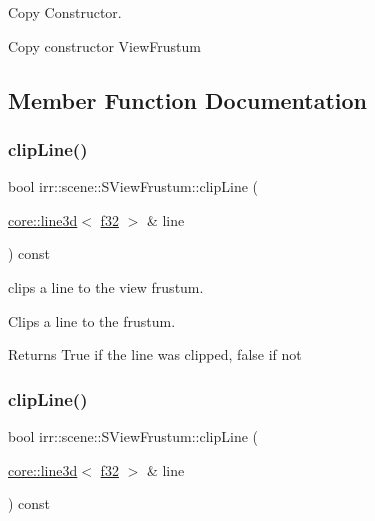 Copy Constructor. 

Copy constructor View\+Frustum 

\subsection{Member Function Documentation}
\mbox{\label{structirr_1_1scene_1_1SViewFrustum_a8d4a42afc55dde3b193ad0b1311f9dfe}} 
\subsubsection{\texorpdfstring{clip\+Line()}{clipLine()}\hspace{0.1cm}{\footnotesize\ttfamily [1/2]}}
{\footnotesize\ttfamily bool irr\+::scene\+::\+S\+View\+Frustum\+::clip\+Line (\begin{DoxyParamCaption}\item[{\hyperlink{classirr_1_1core_1_1line3d}{core\+::line3d}$<$ \hyperlink{namespaceirr_a0277be98d67dc26ff93b1a6a1d086b07}{f32} $>$ \&}]{line }\end{DoxyParamCaption}) const\hspace{0.3cm}{\ttfamily [inline]}}



clips a line to the view frustum. 

Clips a line to the frustum.

\begin{DoxyReturn}{Returns}
True if the line was clipped, false if not 
\end{DoxyReturn}
\mbox{\label{structirr_1_1scene_1_1SViewFrustum_a8d4a42afc55dde3b193ad0b1311f9dfe}} 
\subsubsection{\texorpdfstring{clip\+Line()}{clipLine()}\hspace{0.1cm}{\footnotesize\ttfamily [2/2]}}
{\footnotesize\ttfamily bool irr\+::scene\+::\+S\+View\+Frustum\+::clip\+Line (\begin{DoxyParamCaption}\item[{\hyperlink{classirr_1_1core_1_1line3d}{core\+::line3d}$<$ \hyperlink{namespaceirr_a0277be98d67dc26ff93b1a6a1d086b07}{f32} $>$ \&}]{line }\end{DoxyParamCaption}) const}



